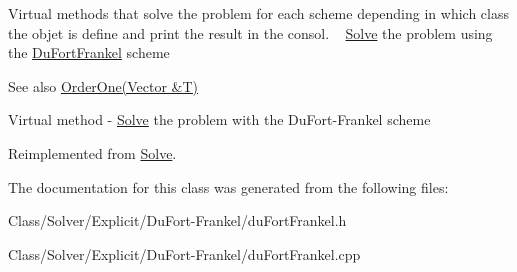 Virtual methods that solve the problem for each scheme depending in which class the objet is define and print the result in the consol. ~\newline
 \hyperlink{class_solve}{Solve} the problem using the \hyperlink{class_du_fort_frankel}{Du\+Fort\+Frankel} scheme \begin{DoxySeeAlso}{See also}
\hyperlink{class_explicit_a6069720017eb2bb0d989b2557c162c97}{Order\+One(\+Vector \&\+T)}
\end{DoxySeeAlso}
Virtual method -\/ \hyperlink{class_solve}{Solve} the problem with the Du\+Fort-\/\+Frankel scheme 

Reimplemented from \hyperlink{class_solve_a1a56722993fdabea9928637d7dd8a2c7}{Solve}.



The documentation for this class was generated from the following files\+:\begin{DoxyCompactItemize}
\item 
Class/\+Solver/\+Explicit/\+Du\+Fort-\/\+Frankel/du\+Fort\+Frankel.\+h\item 
Class/\+Solver/\+Explicit/\+Du\+Fort-\/\+Frankel/du\+Fort\+Frankel.\+cpp\end{DoxyCompactItemize}
